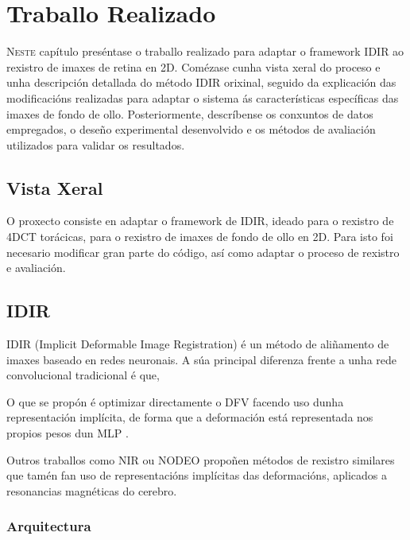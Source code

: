 \chapter{Traballo Realizado}
\label{chap:Traballo Realizado}

\lettrine{N}{este} capítulo preséntase o traballo realizado para adaptar o framework IDIR ao rexistro de imaxes de retina en 2D. Comézase cunha vista xeral do proceso e unha descripción detallada do método IDIR orixinal, seguido da explicación das modificacións realizadas para adaptar o sistema ás características específicas das imaxes de fondo de ollo. Posteriormente, descríbense os conxuntos de datos empregados, o deseño experimental desenvolvido e os métodos de avaliación utilizados para validar os resultados.

\section{Vista Xeral}
\label{sec:VistaXeral}

O proxecto consiste en adaptar o framework de IDIR, ideado para o rexistro de \gls{4DCT} torácicas, para o rexistro de imaxes de fondo de ollo en 2D.
Para isto foi necesario modificar gran parte do código, así como adaptar o proceso de rexistro e avaliación.

\section{IDIR}
\label{sec:IDIR}

IDIR (Implicit Deformable Image Registration) é un método de aliñamento de imaxes baseado en redes neuronais. 
A súa principal diferenza frente a unha rede convolucional tradicional é que, 

O que se propón é optimizar directamente o DFV facendo uso dunha representación implícita, de forma que a deformación está representada nos propios pesos dun MLP \cite{wolterink2021implicit}.

Outros traballos como NIR \cite{sun2024medicalimageregistrationneural} ou NODEO \cite{nodeo} propoñen métodos de rexistro similares que tamén fan uso de representacións implícitas das deformacións, aplicados a resonancias magnéticas do cerebro.

\subsection{Arquitectura}
\label{subsubsec:Arquitectura}


